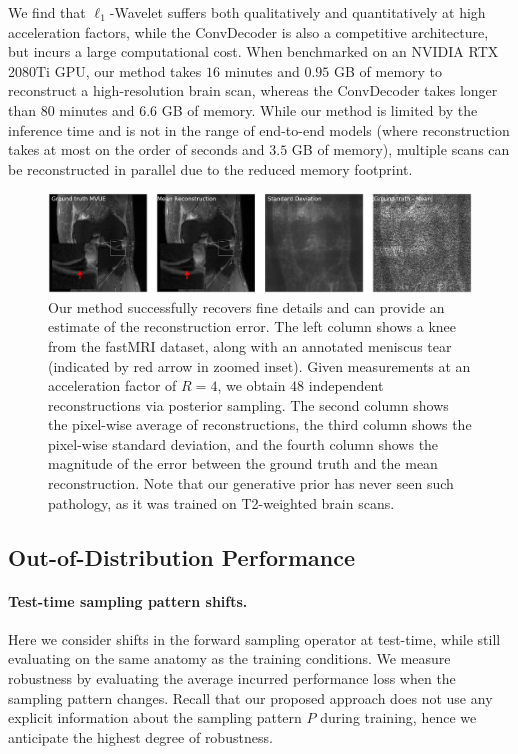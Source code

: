 We find that $\ell_1$-Wavelet suffers both qualitatively and quantitatively at high acceleration factors, while the ConvDecoder is also a competitive architecture, but incurs a large computational cost. When benchmarked on an NVIDIA RTX 2080Ti GPU, our method takes $16$ minutes and $0.95$ GB of memory to reconstruct a high-resolution brain scan, whereas the ConvDecoder takes longer than $80$ minutes and $6.6$ GB of memory. While our method is limited by the inference time and is not in the range of end-to-end models (where reconstruction takes at most on the order of seconds and $3.5$ GB of memory), multiple scans can be reconstructed in parallel due to the reduced memory footprint.
\begin{figure}[t]
\begin{center}
  \includegraphics[width=\columnwidth]{uncertainty_annotated-comp.pdf}
\end{center}
\caption{\small Our method successfully recovers fine details and can provide an estimate of the reconstruction error. The left column shows a knee from the fastMRI dataset, along with an annotated meniscus tear (indicated by red arrow in zoomed inset). Given measurements at an acceleration factor of $R=4$, we obtain $48$ independent reconstructions via posterior sampling. The second column shows the pixel-wise average of reconstructions, the third column shows the pixel-wise standard deviation, and the fourth column shows the magnitude of the error between the ground truth and the mean reconstruction. Note that our generative prior has never seen such pathology, as it was trained on T2-weighted brain scans.}
\label{fig:tear}
\end{figure}




\subsection{Out-of-Distribution Performance}\label{sec:exp-out}

\paragraph{Test-time sampling pattern shifts.}
Here we consider shifts in the forward sampling operator at test-time, while still evaluating on the same anatomy as the training conditions. We measure robustness by evaluating the average incurred performance loss when the sampling pattern changes. Recall that our proposed approach does not use any explicit information about the sampling pattern $P$ during training, hence we anticipate the highest degree of robustness. 

